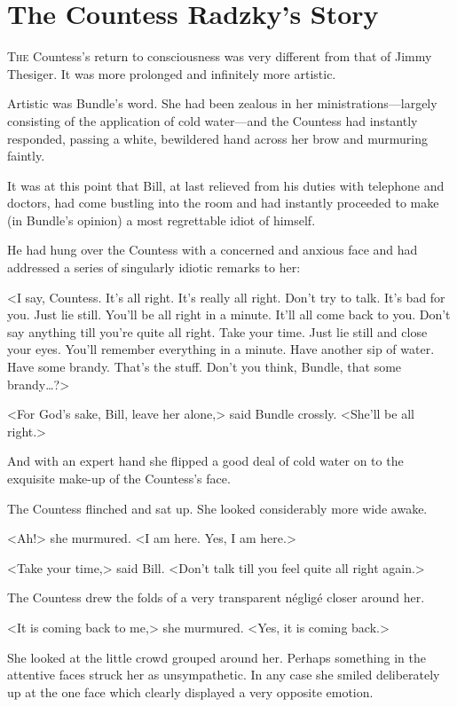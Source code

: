 \chapter{The Countess Radzky's Story}

\lettrine{T}{he} Countess's return to consciousness was very different from that of Jimmy Thesiger. It was more prolonged and infinitely more artistic.

\zz
Artistic was Bundle's word. She had been zealous in her ministrations—largely consisting of the application of cold water—and the Countess had instantly responded, passing a white, bewildered hand across her brow and murmuring faintly.

It was at this point that Bill, at last relieved from his duties with telephone and doctors, had come bustling into the room and had instantly proceeded to make (in Bundle's opinion) a most regrettable idiot of himself.

He had hung over the Countess with a concerned and anxious face and had addressed a series of singularly idiotic remarks to her:

<I say, Countess. It's all right. It's really all right. Don't try to talk. It's bad for you. Just lie still. You'll be all right in a minute. It'll all come back to you. Don't say anything till you're quite all right. Take your time. Just lie still and close your eyes. You'll remember everything in a minute. Have another sip of water. Have some brandy. That's the stuff. Don't you think, Bundle, that some brandy\dots?>

<For God's sake, Bill, leave her alone,> said Bundle crossly. <She'll be all right.>

And with an expert hand she flipped a good deal of cold water on to the exquisite make-up of the Countess's face.

The Countess flinched and sat up. She looked considerably more wide awake.

<Ah!> she murmured. <I am here. Yes, I am here.>

<Take your time,> said Bill. <Don't talk till you feel quite all right again.>

The Countess drew the folds of a very transparent négligé closer around her.

<It is coming back to me,> she murmured. <Yes, it is coming back.>

She looked at the little crowd grouped around her. Perhaps something in the attentive faces struck her as unsympathetic. In any case she smiled deliberately up at the one face which clearly displayed a very opposite emotion.

